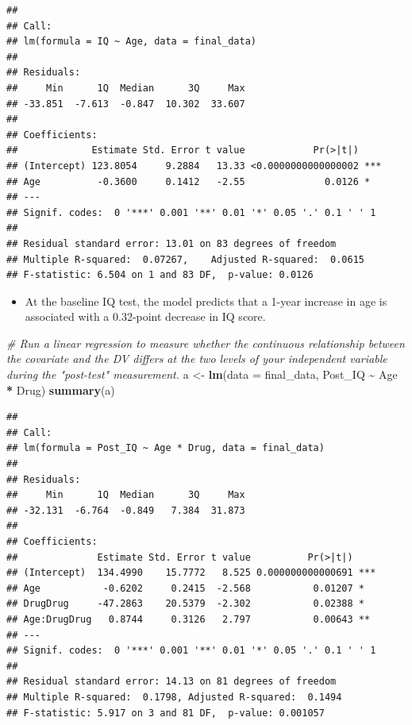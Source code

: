 \documentclass[
]{book}
\newenvironment{Shaded}{\begin{snugshade}}{\end{snugshade}}
\newcommand{\AttributeTok}[1]{\textcolor[rgb]{0.13,0.29,0.53}{#1}}
\newcommand{\CommentTok}[1]{\textcolor[rgb]{0.56,0.35,0.01}{\textit{#1}}}
\newcommand{\FunctionTok}[1]{\textcolor[rgb]{0.13,0.29,0.53}{\textbf{#1}}}
\newcommand{\NormalTok}[1]{#1}
\newcommand{\OtherTok}[1]{\textcolor[rgb]{0.56,0.35,0.01}{#1}}
\newcommand{\SpecialCharTok}[1]{\textcolor[rgb]{0.81,0.36,0.00}{\textbf{#1}}}
\providecommand{\tightlist}{%
  \setlength{\itemsep}{0pt}\setlength{\parskip}{0pt}}
\begin{document}
\begin{verbatim}
## 
## Call:
## lm(formula = IQ ~ Age, data = final_data)
## 
## Residuals:
##     Min      1Q  Median      3Q     Max 
## -33.851  -7.613  -0.847  10.302  33.607 
## 
## Coefficients:
##             Estimate Std. Error t value            Pr(>|t|)    
## (Intercept) 123.8054     9.2884   13.33 <0.0000000000000002 ***
## Age          -0.3600     0.1412   -2.55              0.0126 *  
## ---
## Signif. codes:  0 '***' 0.001 '**' 0.01 '*' 0.05 '.' 0.1 ' ' 1
## 
## Residual standard error: 13.01 on 83 degrees of freedom
## Multiple R-squared:  0.07267,    Adjusted R-squared:  0.0615 
## F-statistic: 6.504 on 1 and 83 DF,  p-value: 0.0126
\end{verbatim}

\begin{itemize}
\tightlist
\item
  At the baseline IQ test, the model predicts that a 1-year increase in age is associated with a 0.32-point decrease in IQ score.
\end{itemize}

\begin{Shaded}
\begin{Highlighting}[]
\CommentTok{\# Run a linear regression to measure whether the continuous relationship between the covariate and the DV differs at the two levels of your independent variable during the "post{-}test" measurement. }
\NormalTok{a }\OtherTok{\textless{}{-}} \FunctionTok{lm}\NormalTok{(}\AttributeTok{data =}\NormalTok{ final\_data, Post\_IQ }\SpecialCharTok{\textasciitilde{}}\NormalTok{ Age }\SpecialCharTok{*}\NormalTok{ Drug)}
\FunctionTok{summary}\NormalTok{(a)}
\end{Highlighting}
\end{Shaded}

\begin{verbatim}
## 
## Call:
## lm(formula = Post_IQ ~ Age * Drug, data = final_data)
## 
## Residuals:
##     Min      1Q  Median      3Q     Max 
## -32.131  -6.764  -0.849   7.384  31.873 
## 
## Coefficients:
##              Estimate Std. Error t value          Pr(>|t|)    
## (Intercept)  134.4990    15.7772   8.525 0.000000000000691 ***
## Age           -0.6202     0.2415  -2.568           0.01207 *  
## DrugDrug     -47.2863    20.5379  -2.302           0.02388 *  
## Age:DrugDrug   0.8744     0.3126   2.797           0.00643 ** 
## ---
## Signif. codes:  0 '***' 0.001 '**' 0.01 '*' 0.05 '.' 0.1 ' ' 1
## 
## Residual standard error: 14.13 on 81 degrees of freedom
## Multiple R-squared:  0.1798, Adjusted R-squared:  0.1494 
## F-statistic: 5.917 on 3 and 81 DF,  p-value: 0.001057
\end{verbatim}
\end{document}
